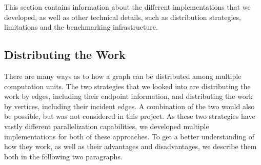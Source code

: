 \documentclass[letterpaper]{article}
\begin{document}

This section contains information about the different implementations that we developed, as well as other technical
details, such as distribution strategies, limitations and the benchmarking infrastructure.

\subsection{Distributing the Work}
There are many ways as to how a graph can be distributed among multiple computation units. The two strategies that we
looked into are distributing the work by edges, including their endpoint information, and distributing the work by
vertices, including their incident edges. A combination of the two would also be possible, but was not considered in
this project. As these two strategies have vastly different parallelization capabilities, we developed multiple
implementations for both of these approaches. To get a better understanding of how they work, as well as their
advantages and disadvantages, we describe them both in the following two paragraphs.
\end{document}
